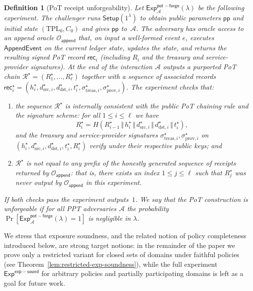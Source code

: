\documentclass[11pt]{article}
\newtheorem{definition}{Definition}
\begin{document}
\begin{definition}[PoT receipt unforgeability]
\label{def:pot-unforgeability}
Let $\mathsf{Exp}^{\mathsf{pot-forge}}_{\mathcal{A}}(\lambda)$ be the following experiment.
The challenger runs $\mathsf{Setup}(1^\lambda)$ to obtain public parameters
$\mathsf{pp}$ and initial state $(\mathrm{TPL}_0,C_0)$ and gives $\mathsf{pp}$ to~$\mathcal{A}$.
The adversary has oracle access to an \emph{append oracle}
$\mathcal{O}_{\mathsf{append}}$ that, on input a well-formed event $e$,
executes $\mathsf{AppendEvent}$ on the current ledger state, updates the state,
and returns the resulting signed PoT record $\mathsf{rec}_i$ (including $R_i$ and the treasury and service-provider signatures).
At the end of the interaction $\mathcal{A}$ outputs a purported PoT chain
$\mathcal{R}^\star = (R^\star_1,\ldots,R^\star_\ell)$ together with a sequence
of associated records $\mathsf{rec}^\star_i = (h^\star_i,d^\star_{\mathrm{src},i},
d^\star_{\mathrm{dst},i},t^\star_i,\sigma^\star_{\mathrm{treas},i},\sigma^\star_{\mathrm{prov},i})$.
The experiment checks that:
\begin{enumerate}[noitemsep]
  \item the sequence $\mathcal{R}^\star$ is internally consistent with the
        public PoT chaining rule and the signature scheme: for all $1 \leq i \leq \ell$ we have
        \[
          R^\star_i = H(R^\star_{i-1} \,\Vert\, h^\star_i \,\Vert\, d^\star_{\mathrm{src},i} \,\Vert\, d^\star_{\mathrm{dst},i} \,\Vert\, t^\star_i),
        \]
        and the treasury and service-provider signatures $\sigma^\star_{\mathrm{treas},i},\sigma^\star_{\mathrm{prov},i}$ on $(h^\star_i,d^\star_{\mathrm{src},i},d^\star_{\mathrm{dst},i},t^\star_i,R^\star_i)$ verify under their respective public keys; and
  \item $\mathcal{R}^\star$ is \emph{not} equal to any prefix of the honestly
        generated sequence of receipts returned by $\mathcal{O}_{\mathsf{append}}$:
        that is, there exists an index $1 \leq j \leq \ell$ such that
        $R^\star_j$ was never output by $\mathcal{O}_{\mathsf{append}}$ in this
        experiment.
\end{enumerate}
If both checks pass the experiment outputs~$1$.
We say that the PoT construction is \emph{unforgeable} if for all PPT adversaries
$\mathcal{A}$ the probability
$\Pr[\mathsf{Exp}^{\mathsf{pot-forge}}_{\mathcal{A}}(\lambda)=1]$
is negligible in $\lambda$.
\end{definition}

We stress that exposure soundness, and the related notion of policy completeness introduced below, are strong target notions:
in the remainder of the paper we prove only a restricted variant for closed sets of domains under faithful policies
(see Theorem~\ref{lem:restricted-exp-soundness}), while the full experiment
$\mathsf{Exp}^{\mathsf{exp-sound}}$ for arbitrary policies and partially participating domains is left as a goal for
future work.
\end{document}
